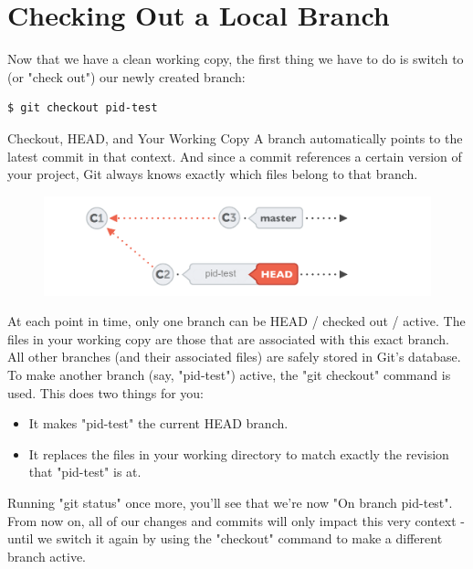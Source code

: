\documentclass{article}
\begin{document}
\section{Checking Out a Local Branch}
Now that we have a clean working copy, the first thing we have to do is switch to (or "check out") our newly created branch:
\begin{lstlisting}
$ git checkout pid-test
\end{lstlisting}

\begin{concept}
Checkout, HEAD, and Your Working Copy
\newline\newline
A branch automatically points to the latest commit in that context. And since a commit references a certain version of your project, Git always knows exactly which files belong to that branch.
\begin{figure}[h]
    \centering
    \includegraphics[width=4.5in]{images/branch-pointers.png}
\end{figure}
At each point in time, only one branch can be HEAD / checked out / active. The files in your working copy are those that are associated with this exact branch. All other branches (and their associated files) are safely stored in Git's database.
\newline\newline
To make another branch (say, "pid-test") active, the "git checkout" command is used. This does two things for you:
\begin{itemize}
    \item It makes "pid-test" the current HEAD branch.
    \item It replaces the files in your working directory to match exactly the revision that "pid-test" is at.
\end{itemize}
\end{concept}
Running "git status" once more, you'll see that we're now "On branch pid-test". From now on, all of our changes and commits will only impact this very context - until we switch it again by using the "checkout" command to make a different branch active.
\newline\newline
\end{document}
